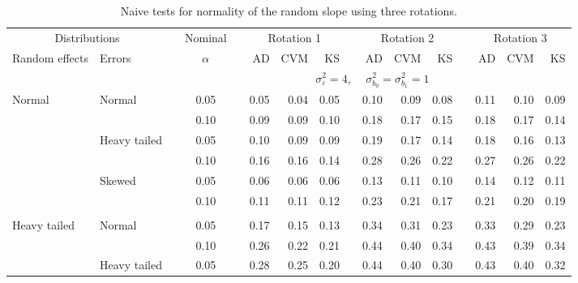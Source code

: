\documentclass[12pt]{article} %
\begin{document}
\begin{table}[ht]
\begin{scriptsize}
\begin{center}
\begin{tabular}{ll p{.1cm} c p{.1cm} rrr p{.1cm} rrr p{.1cm} rrr}
   \hline
\end{tabular}
\end{center}
\end{scriptsize}
\end{table}



\begin{table}[ht]
\caption{Naive tests for normality of the random slope using three rotations.}
\begin{scriptsize}
\begin{center}
\begin{tabular}{ll p{.1cm} c p{.1cm} rrr p{.1cm} rrr p{.1cm} rrr}
  \hline
  \multicolumn{2}{c}{Distributions}& & Nominal & &  \multicolumn{3}{c}{Rotation 1} & & \multicolumn{3}{c}{Rotation 2} & & \multicolumn{3}{c}{Rotation 3}\\ \cline{1-2} \cline{6-8} \cline{10-12} \cline{14-16}
  Random effects & Errors & & $\alpha$ & & AD & CVM & KS & & AD & CVM & KS & & AD & CVM & KS \\ 
   \hline
& && && \multicolumn{9}{c}{$\sigma_{\varepsilon}^2 = 4$, \ \ $\sigma_{b_0}^2 = \sigma_{b_1}^2 = 1$} \\ \cline{6-16}
\rowcolor{gray!20}Normal       & Normal       && 0.05 &&   0.05 & 0.04 & 0.05 && 0.10 & 0.09 & 0.08 && 0.11 & 0.10 & 0.09 \\
\rowcolor{gray!20}             &              && 0.10 &&   0.09 & 0.09 & 0.10 && 0.18 & 0.17 & 0.15 && 0.18 & 0.17 & 0.14 \\
\rowcolor{gray!20}             & Heavy tailed && 0.05 &&   0.10 & 0.09 & 0.09 && 0.19 & 0.17 & 0.14 && 0.18 & 0.16 & 0.13 \\
\rowcolor{gray!20}             &              && 0.10 &&   0.16 & 0.16 & 0.14 && 0.28 & 0.26 & 0.22 && 0.27 & 0.26 & 0.22 \\
\rowcolor{gray!20}             & Skewed       && 0.05 &&   0.06 & 0.06 & 0.06 && 0.13 & 0.11 & 0.10 && 0.14 & 0.12 & 0.11 \\
\rowcolor{gray!20}             &              && 0.10 &&   0.11 & 0.11 & 0.12 && 0.23 & 0.21 & 0.17 && 0.21 & 0.20 & 0.19 \\
             &&&&&&&&&&&&&&&\\
Heavy tailed & Normal       && 0.05 &&   0.17 & 0.15 & 0.13 && 0.34 & 0.31 & 0.23 &&  0.33 & 0.29 & 0.23 \\
             &              && 0.10 &&   0.26 & 0.22 & 0.21 && 0.44 & 0.40 & 0.34 &&  0.43 & 0.39 & 0.34 \\
             & Heavy tailed && 0.05 &&   0.28 & 0.25 & 0.20 && 0.44 & 0.40 & 0.30 &&  0.43 & 0.40 & 0.32 \\

\end{tabular}
\end{center}
\end{scriptsize}
\end{table}
\end{document}
